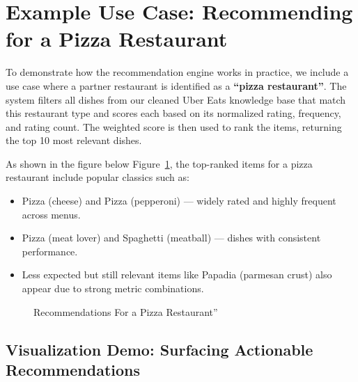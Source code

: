 \documentclass[
  11pt,
  a4paper,
  DIV=11,
  numbers=noendperiod]{scrartcl}
\providecommand{\tightlist}{%
  \setlength{\itemsep}{0pt}\setlength{\parskip}{0pt}}\usepackage{longtable,booktabs,array}
\begin{document}
\section{Example Use Case: Recommending for a Pizza
Restaurant}\label{example-use-case-recommending-for-a-pizza-restaurant}

To demonstrate how the recommendation engine works in practice, we
include a use case where a partner restaurant is identified as a
\textbf{``pizza restaurant''}. The system filters all dishes from our
cleaned Uber Eats knowledge base that match this restaurant type and
scores each based on its normalized rating, frequency, and rating count.
The weighted score is then used to rank the items, returning the top 10
most relevant dishes.

As shown in the figure below Figure~\ref{fig-rec-example}, the
top-ranked items for a pizza restaurant include popular classics such
as:

\begin{itemize}
\tightlist
\item
  Pizza (cheese) and Pizza (pepperoni) --- widely rated and highly
  frequent across menus.
\item
  Pizza (meat lover) and Spaghetti (meatball) --- dishes with consistent
  performance.
\item
  Less expected but still relevant items like Papadia (parmesan crust)
  also appear due to strong metric combinations.
\end{itemize}

\begin{figure}

\caption{\label{fig-rec-example}Recommendations For a Pizza
Restaurant''}


\end{figure}%

\subsection{Visualization Demo: Surfacing Actionable
Recommendations}\label{visualization-demo-surfacing-actionable-recommendations}
\end{document}

